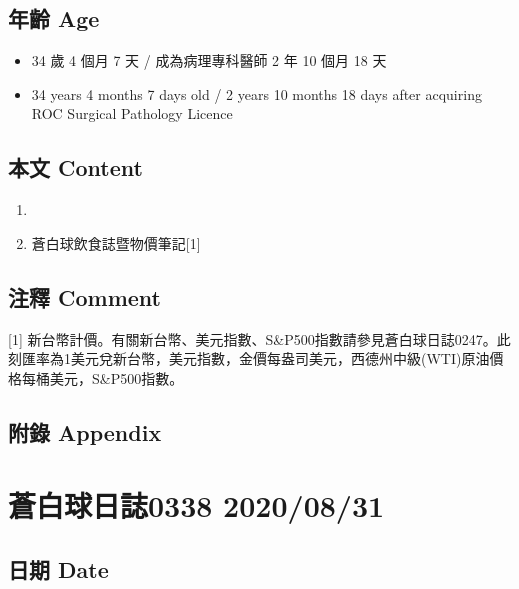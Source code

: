 \documentclass[a5paper, 11pt
]{book}
\providecommand{\tightlist}{%
  \setlength{\itemsep}{0pt}\setlength{\parskip}{0pt}}
\begin{document}
\hypertarget{ux5e74ux9f61-age-90}{%
\subsection{年齡 Age}\label{ux5e74ux9f61-age-90}}

\begin{itemize}
\tightlist
\item
  34 歲 4 個月 7 天 / 成為病理專科醫師 2 年 10 個月 18 天
\item
  34 years 4 months 7 days old / 2 years 10 months 18 days after
  acquiring ROC Surgical Pathology Licence
\end{itemize}

\hypertarget{ux672cux6587-content-90}{%
\subsection{本文 Content}\label{ux672cux6587-content-90}}

\begin{enumerate}
\def\labelenumi{\arabic{enumi}.}
\tightlist
\item
\item
  蒼白球飲食誌暨物價筆記{[}1{]}
\end{enumerate}

\hypertarget{ux6ce8ux91cb-comment-90}{%
\subsection{注釋 Comment}\label{ux6ce8ux91cb-comment-90}}

{[}1{]}
新台幣計價。有關新台幣、美元指數、S\&P500指數請參見蒼白球日誌0247。此刻匯率為1美元兌新台幣，美元指數，金價每盎司美元，西德州中級(WTI)原油價格每桶美元，S\&P500指數。

\hypertarget{ux9644ux9304-appendix-90}{%
\subsection{附錄 Appendix}\label{ux9644ux9304-appendix-90}}

\hypertarget{ux84bcux767dux7403ux65e5ux8a8c0338-20200831}{%
\section{蒼白球日誌0338
2020/08/31}\label{ux84bcux767dux7403ux65e5ux8a8c0338-20200831}}

\hypertarget{ux65e5ux671f-date-91}{%
\subsection{日期 Date}\label{ux65e5ux671f-date-91}}
\end{document}
